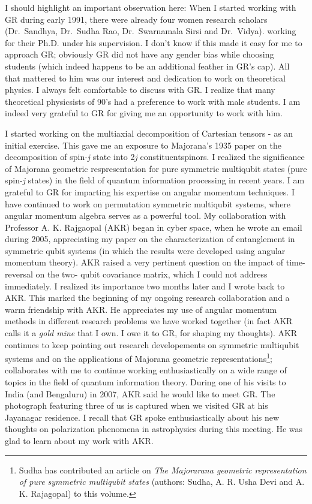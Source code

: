 I should highlight an important observation here: When I started working with GR during early 1991, there were already four women research scholars (Dr.\ Sandhya, Dr.\ Sudha Rao, Dr.\ Swarnamala Sirsi and Dr.\ Vidya). working for their Ph.D. under his supervision. I don't know if this made it easy for me to approach GR; obviously GR did not have any gender bias while choosing students (which indeed happens to be an additional feather in GR's cap). All that mattered to him was our interest and dedication to work on theoretical physics. I always felt comfortable to discuss with GR. I realize that many theoretical physicsists of 90's had a preference to work with male students. I am indeed very grateful to GR for giving me an opportunity to work with him.
\vskip 2pt

I started working on the multiaxial decomposition of Cartesian tensors - as an initial exercise. This gave me an exposure to Majorana's 1935 paper on the decomposition of spin-\textit{j} state into 2\textit{j} constituent\break spinors. I realized the significance of Majorana geometric respresentation for pure symmetric multiqubit states (pure spin-\textit{j} states) in the field of quantum information processing in recent years. I am grateful to GR for imparting his expertise on angular momentum techniques. I have continued to work on permutation symmetric multiqubit systems, where angular momentum algebra serves as a powerful tool. My collaboration with Professor A. K. Rajgaopal (AKR) began in cyber space, when he wrote an email during 2005, appreciating my paper on the characterization of entanglement in symmetric qubit systems (in which the results were developed using angular momentum theory). AKR raised a very pertinent question on the impact of time-reversal on the two- qubit covariance matrix, which I could not address immediately. I realized its importance two months later and I wrote back to AKR. This marked the beginning of my ongoing research collaboration and a warm friendship with AKR. He appreciates my use of angular momentum methods in different research problems we have worked together (in fact AKR calls it a \textit{gold mine} that I own. I owe it to GR, for shaping my thoughts). AKR continues to keep pointing out research developements on symmetric multiqubit systems and on the applications of Majorana geometric representations\footnote{Sudha has contributed an article on \textit{The Majorarana  geometric representation of pure symmetric multiqubit states} (authors: Sudha, A. R. Usha Devi and A. K. Rajagopal) to this volume.}; collaborates with me to continue working enthusiastically on a wide range of topics in the field of quantum information theory. During one of his visits to India (and Bengaluru) in 2007, AKR said he would like to meet GR. The photograph featuring three of us is captured when we visited GR at his Jayanagar residence. I recall that GR spoke enthusiastically about his new thoughts on polarization phenomena in astrophysics during this meeting. He was glad to learn about my work with AKR.
\newpage

